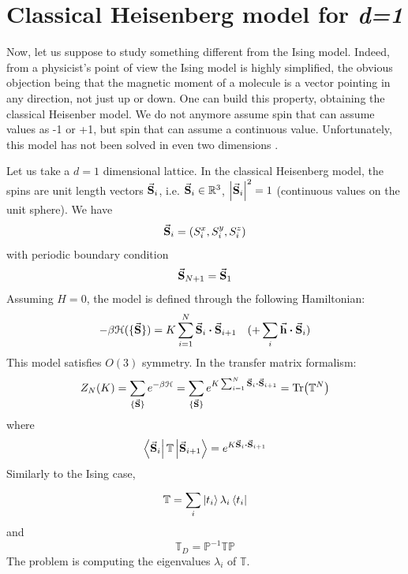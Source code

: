 \documentclass[../main/main.tex]{subfiles}
\begin{document}
\section{Classical Heisenberg model for \emph{d=1} }

Now, let us suppose to study something different from the Ising model. Indeed, from a physicist's point of view the Ising model is highly simplified, the obvious objection being that the magnetic moment of a molecule is a vector pointing in any direction, not just up or down. One can build this property, obtaining the classical Heisenber model.
We do not anymore assume spin that can assume values as -1 or +1, but spin that can assume a continuous value. Unfortunately, this model has not been solved in even two dimensions \cite{9_lesson_4}.

Let us take a \( d=1 \) dimensional lattice.
In the classical Heisenberg model, the spins are unit length vectors \( \va{S}_i \), i.e. \( \va{S}_i \in \mathbb{R}^3 \), \( \abs{\va{S}_i}^2 = 1 \) (continuous values on the unit sphere). We have
\begin{equation*}
  \va{S}_i = ( S_i^x,S_i^y,S_i^z)
\end{equation*}
 with periodic boundary condition
\begin{equation*}
  \va{S}_{N+1} = \va{S}_1 
\end{equation*}
Assuming \( H=0 \), the model is defined through the following Hamiltonian:
\begin{equation}
  - \beta \mathcal{H} ( \{ \va{S} \}  ) = K \sum_{i=1}^{N} \va{S}_i \vdot \va{S}_{i+1}  \quad  (+ \sum_{i}^{} \va{h} \vdot \va{S}_i  )
\end{equation}
This model satisfies \( O(3) \) symmetry. In the transfer matrix formalism:
\begin{equation}
  Z_N (K) = \sum_{\{ \va{S} \}  }^{} e^{-\beta \mathcal{H}} = \sum_{\{ \va{S} \}  }^{} e^{K \sum_{i=1}^{N} \va{S}_i \vdot \va{S}_{i+1} } = \Tr(\mathbb{T}^N)
\end{equation}
where 
\begin{equation*}
\bra{\va{S}_i} \mathbb{T} \ket{\va{S}_{i+1}} = e^{K \va{S}_i \vdot \va{S}_{i+1}} 
\end{equation*}
Similarly to the Ising case, 
\begin{equation*}
  \mathbb{T} = \sum_{i}^{} \ket{t_i} \lambda _i \bra{t_i}
\end{equation*}
and
\begin{equation*}
  \mathbb{T}_D = \mathbb{P}^{-1} \mathbb{T}\mathbb{P}
\end{equation*}
The problem is computing the eigenvalues \( \lambda _i \) of \( \mathbb{T} \).
\end{document}
